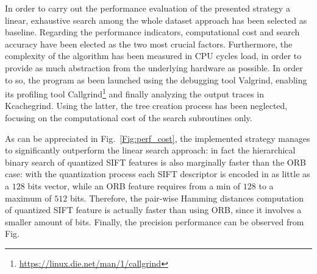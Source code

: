 \documentclass[a4paper, 11pt, oneside]{article}
\begin{document}
In order to carry out the performance evaluation of the presented strategy a linear, exhaustive search among the whole dataset approach has been selected as baseline. Regarding the performance indicators, computational cost and search accuracy have been elected as the two most crucial factors. Furthermore, the complexity of the algorithm has been measured in CPU cycles load, in order to provide as much abstraction from the underlying hardware as possible. In order to so, the program as been launched using the debugging tool Valgrind, enabling its profiling tool Callgrind\footnote{\url{https://linux.die.net/man/1/callgrind}} and finally analyzing the output traces in Kcachegrind. Using the latter, the tree creation process has been neglected, focusing on the computational cost of the search subroutines only.


As can be appreciated in Fig.~\ref{Fig:perf_cost}, the implemented strategy manages to significantly outperform the linear search approach: in fact the hierarchical binary search of quantized SIFT features is also marginally faster than the ORB case: with the quantization process each SIFT descriptor is encoded in as little as a $128$ bits vector, while an ORB feature requires from a min of $128$ to a maximum of $512$ bits. Therefore, the pair-wise Hamming distances computation of quantized SIFT feature is actually faster than using ORB, since it involves a smaller amount of bits. Finally, the precision performance can be observed from Fig.



\end{document}
